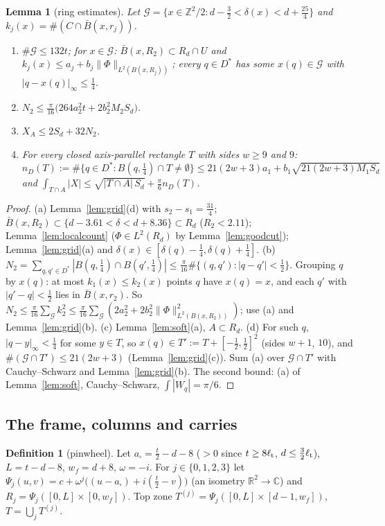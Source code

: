 \documentclass[11pt]{article}
\newtheorem{lemma}[theorem]{Lemma}
\theoremstyle{definition}
\newtheorem{definition}[theorem]{Definition}
\theoremstyle{remark}
\newcommand{\R}{\mathbb R}
\newcommand{\C}{\mathbb C}
\newcommand{\Z}{\mathbb Z}
\newcommand{\dep}{\delta}
\newcommand{\lt}{\ell_{\rm t}}
\begin{document}
\begin{lemma}[ring estimates]\label{lem:ring}
Let $\mathcal G=\{x\in\Z^2/2:d-\frac32<\dep(x)<d+\frac{25}4\}$ and $k_j(x)=\#(C\cap\bar B(x,r_j))$.
\begin{enumerate}[label=(\alph*)]
\item $\#\mathcal G\le132t$; for $x\in\mathcal G$: $\bar B(x,R_2)\subset R_d\cap U$ and $k_j(x)\le a_j+b_j\|\Phi\|_{L^2(B(x,R_j))}$; every $q\in D^\ast$
  has some $x(q)\in\mathcal G$ with $|q-x(q)|_\infty\le\frac14$.
\item $N_2\le\frac\pi{16}\bigl(264a_2^2t+2b_2^2M_2S_d\bigr)$.
\item $X_A\le2S_d+32N_2$.
\item For every closed axis-parallel rectangle $T$ with sides $w\ge9$ and $9$:
  $n_D(T):=\#\{q\in D^\ast:B(q,\frac14)\cap T\ne\emptyset\}\le21(2w+3)a_1+b_1\sqrt{21(2w+3)M_1S_d}$ and
  $\int_{T\cap A}|X|\le\sqrt{|T\cap A|\,S_d}+\frac\pi6n_D(T)$.
\end{enumerate}
\end{lemma}
\begin{proof}
(a) Lemma~\ref{lem:grid}(d) with $s_2-s_1=\frac{31}4$; $\bar B(x,R_2)\subset\{d-3.61<\dep<d+8.36\}\subset R_d$ ($R_2<2.11$); Lemma~\ref{lem:localcount}
($\Phi\in L^2(R_d)$ by Lemma~\ref{lem:goodcut}); Lemma~\ref{lem:grid}(a) and $\dep(x)\in[\dep(q)-\frac14,\dep(q)+\frac14]$.
(b) $N_2=\sum_{q,q'\in D^\ast}|B(q,\frac14)\cap B(q',\frac14)|\le\frac\pi{16}\#\{(q,q'):|q-q'|<\frac12\}$. Grouping $q$ by $x(q)$: at most $k_1(x)\le k_2(x)$
points $q$ have $x(q)=x$, and each $q'$ with $|q'-q|<\frac12$ lies in $\bar B(x,r_2)$. So $N_2\le\frac\pi{16}\sum_{\mathcal G}k_2^2\le\frac\pi{16}\sum_{\mathcal G}(2a_2^2+2b_2^2\|\Phi\|^2_{L^2(B(x,R_2))})$;
use (a) and Lemma~\ref{lem:grid}(b).
(c) Lemma~\ref{lem:soft}(a), $A\subset R_d$. (d) For such $q$, $|q-y|_\infty<\frac14$ for some $y\in T$, so $x(q)\in T':=T+[-\frac12,\frac12]^2$ (sides
$w+1$, $10$), and $\#(\mathcal G\cap T')\le21(2w+3)$ (Lemma~\ref{lem:grid}(c)). Sum (a) over $\mathcal G\cap T'$ with Cauchy--Schwarz and Lemma~\ref{lem:grid}(b).
The second bound: (a) of Lemma~\ref{lem:soft}, Cauchy--Schwarz, $\int|W_q|=\pi/6$.
\end{proof}

\subsection{The frame, columns and carries}

\begin{definition}[pinwheel]\label{def:pinwheel}
Let $a_\square=\frac t2-d-8$ ($>0$ since $t\ge8\lt$, $d\le\frac32\lt$), $L=t-d-8$, $w_f=d+8$, $\omega=-i$. For $j\in\{0,1,2,3\}$ let
$\Psi_j(u,v)=c+\omega^j\bigl((u-a_\square)+i(\tfrac t2-v)\bigr)$ (an isometry $\R^2\to\C$) and $R_j=\Psi_j([0,L]\times[0,w_f])$.
Top zone $T^{(j)}=\Psi_j([0,L]\times[d-1,w_f])$, $T=\bigcup_jT^{(j)}$.
\end{definition}
\end{document}
